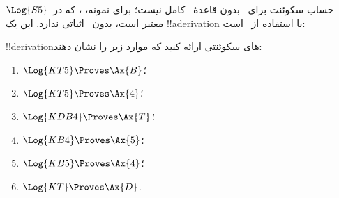 \documentclass[../../../include/open-logic-section]{subfiles}
\begin{document}
\begin{ex}
حساب سکوئنت برای~ بدون قاعدهٔ~\Cut{} کامل نیست؛ برای نمونه،
، که در~$\Log{S5}$ معتبر است، بدون~\Cut{} اثباتی
ندارد. این یک !!a{derivation} با استفاده از~\Cut{} است:
\begin{prooftree}
\end{prooftree}
\end{ex}

\begin{prob}
!!{derivation}های سکوئنتی ارائه کنید که موارد زیر را نشان دهند:
  \begin{enumerate}
  \item $\Log{KT5} \Proves \Ax{B}$؛
  \item $\Log{KT5} \Proves \Ax{4}$؛
  \item $\Log{KDB4} \Proves \Ax{T}$؛
  \item $\Log{KB4} \Proves \Ax{5}$؛
  \item $\Log{KB5} \Proves \Ax{4}$؛
  \item $\Log{KT} \Proves \Ax{D}$.
  \end{enumerate}
\end{prob}
\end{document}

